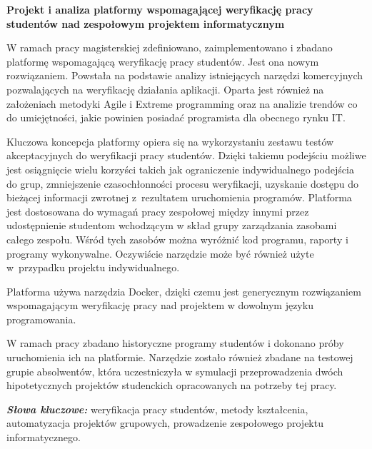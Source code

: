 \newpage
\vspace{10cm}

\newpage
\begin{center}
	\textbf{Projekt i analiza platformy wspomagającej weryfikację pracy studentów
nad zespołowym projektem informatycznym}
\end{center}
 \newline

W ramach pracy magisterskiej zdefiniowano, zaimplementowano i zbadano platformę wspomagającą weryfikację pracy studentów.
Jest ona nowym rozwiązaniem.
Powstała na podstawie analizy istniejących narzędzi komercyjnych pozwalających na weryfikację działania aplikacji.
Oparta jest również na założeniach metodyki Agile i Extreme programming oraz na analizie trendów co do umiejętności, jakie powinien posiadać programista dla obecnego rynku IT.

Kluczowa koncepcja platformy opiera się na wykorzystaniu zestawu testów akceptacyjnych do weryfikacji pracy studentów.
Dzięki takiemu podejściu możliwe jest osiągnięcie wielu korzyści takich jak ograniczenie indywidualnego podejścia do grup, zmniejszenie czasochłonności procesu weryfikacji, uzyskanie dostępu do bieżącej informacji zwrotnej z~rezultatem uruchomienia programów.
Platforma jest dostosowana do wymagań pracy zespołowej między innymi przez udostępnienie studentom wchodzącym w skład grupy zarządzania zasobami całego zespołu.
Wśród tych zasobów można wyróżnić kod programu, raporty i programy wykonywalne.
Oczywiście narzędzie może być również użyte w~przypadku projektu indywidualnego.

Platforma używa narzędzia Docker, dzięki czemu jest generycznym rozwiązaniem wspomagającym weryfikację pracy nad projektem w dowolnym języku programowania.

W ramach pracy zbadano historyczne programy studentów i dokonano próby uruchomienia ich na platformie.
Narzędzie zostało również zbadane na testowej grupie absolwentów, która uczestniczyła w symulacji przeprowadzenia dwóch hipotetycznych projektów studenckich opracowanych na potrzeby tej pracy. \newline



\textit{\textbf{Słowa kluczowe:}} weryfikacja pracy studentów, metody kształcenia, automatyzacja projektów grupowych, prowadzenie zespołowego projektu informatycznego.

	\vspace{1cm}


